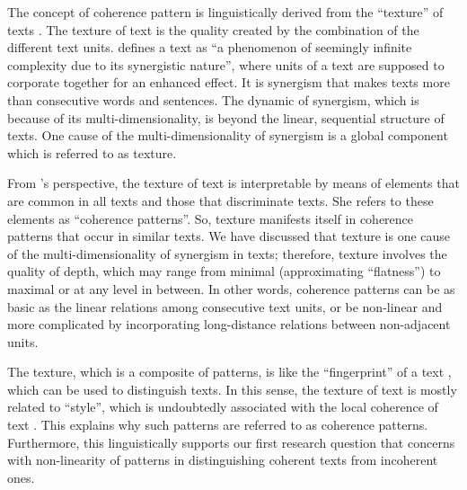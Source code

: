 The concept of coherence pattern is linguistically derived from the ``texture'' of texts \cite{halliday76}.  
The texture of text is the quality created by the combination of the different text units.  
 defines a text as ``a phenomenon of seemingly infinite complexity due to its synergistic nature'', where units of a text are supposed to corporate together for an enhanced effect. 
It is synergism that makes texts more than consecutive words and sentences. 
The dynamic of synergism, which is because of its multi-dimensionality, is beyond the linear, sequential structure of texts. 
One cause of the multi-dimensionality of synergism is a global component which is referred to as texture. 

From 's perspective, the texture of text is interpretable by means of elements that are common in all texts and those that discriminate texts. 
She refers to these elements as ``coherence patterns''.   
So, texture manifests itself in coherence patterns that occur in similar texts. 
We have discussed that texture is one cause of the multi-dimensionality of synergism in texts; therefore, texture involves the quality of depth, which may range from minimal (approximating ``flatness'') to maximal or at any level in between. 
In other words, coherence patterns can be as basic as the linear relations among consecutive text units, or be non-linear and more complicated by incorporating long-distance relations between non-adjacent units. 

The texture, which is a composite of patterns, is like the ``fingerprint'' of a text \cite{stoddard91}, which can be used to distinguish texts. 
In this sense, the texture of text is mostly related to ``style'', which is undoubtedly associated with the local coherence of text \cite{barzilay08}. 
This explains why such patterns are referred to as coherence patterns. 
Furthermore, this linguistically supports our first research question that concerns with \mbox{non-linearity} of patterns in distinguishing coherent texts from incoherent ones.  


